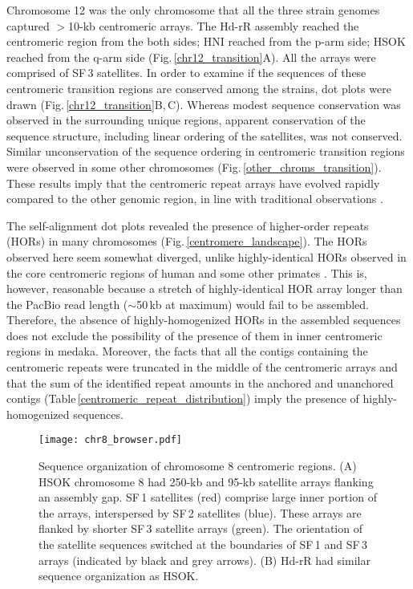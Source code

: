   Chromosome 12 was the only chromosome that all the three strain genomes captured $>$10-kb centromeric arrays. The Hd-rR assembly reached the centromeric region from the both sides; HNI reached from the p-arm side; HSOK reached from the q-arm side (Fig.\,\ref{chr12_transition}A). All the arrays were comprised of SF\,3 satellites. In order to examine if the sequences of these centromeric transition regions are conserved among the strains, dot plots were drawn (Fig.\,\ref{chr12_transition}B,\,C). Whereas modest sequence conservation was observed in the surrounding unique regions, apparent conservation of the sequence structure, including linear ordering of the satellites, was not conserved. Similar unconservation of the sequence ordering in centromeric transition regions were observed in some other chromosomes (Fig.\,\ref{other_chroms_transition}). These results imply that the centromeric repeat arrays have evolved rapidly compared to the other genomic region, in line with traditional observations \cite{Willard1991}.

  The self-alignment dot plots revealed the presence of higher-order repeats (HORs) in many chromosomes (Fig.\,\ref{centromere_landscape}). The HORs observed here seem somewhat diverged, unlike highly-identical HORs observed in the core centromeric regions of human and some other primates \cite{Willard1987}. This is, however, reasonable because a stretch of highly-identical HOR array longer than the PacBio read length ($\sim$50\,kb at maximum) would fail to be assembled. Therefore, the absence of highly-homogenized HORs in the assembled sequences does not exclude the possibility of the presence of them in inner centromeric regions in medaka. Moreover, the facts that all the contigs containing the centromeric repeats were truncated in the middle of the centromeric arrays and that the sum of the identified repeat amounts in the anchored and unanchored contigs (Table\,\ref{centromeric_repeat_distribution}) imply the presence of highly-homogenized sequences.


  \begin{figure*}
    \centering
    \texttt{[image: chr8\_browser.pdf]}
    \caption{
      Sequence organization of chromosome 8 centromeric regions. (A) HSOK chromosome 8 had 250-kb and 95-kb satellite arrays flanking an assembly gap. SF\,1 satellites (red) comprise large inner portion of the arrays, interspersed by SF\,2 satellites (blue). These arrays are flanked by shorter SF\,3 satellite arrays (green). The orientation of the satellite sequences switched at the boundaries of SF\,1 and SF\,3 arrays (indicated by black and grey arrows). (B) Hd-rR had similar sequence organization as HSOK.
    }
    \label{chr8_browser}
  \end{figure*}


